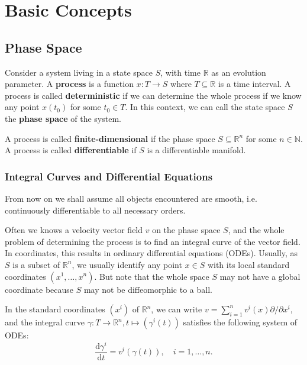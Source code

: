 \documentclass[../main.tex]{subfiles}
\begin{document}
\chapter{Basic Concepts}

\section{Phase Space}
Consider a system living in a state space $S$, with time $\mathbb{R}$ as an evolution parameter. A \textbf{process} is a function $x: T \to S$ where $T \subseteq \mathbb{R}$ is a time interval. A process is called \textbf{deterministic} if we can determine the whole process if we know any point $x(t_0)$ for some $t_0 \in T$. In this context, we can call the state space $S$ the \textbf{phase space} of the system.

A process is called \textbf{finite-dimensional} if the phase space $S \subseteq \mathbb{R}^n$ for some $n \in \mathbb{N}$. A process is called \textbf{differentiable} if $S$ is a differentiable manifold.

\subsection{Integral Curves and Differential Equations}


\begin{plainblackenv}
  From now on we shall assume all objects encountered are smooth, i.e. continuously differentiable to all necessary orders.
\end{plainblackenv}
Often we knows a velocity vector field $v$ on the phase space $S$, and the whole problem of determining the process is to find an integral curve of the vector field. In coordinates, this results in ordinary differential equations (ODEs). Usually, as $S$ is a subset of $\mathbb{R}^n$, we usually identify any point $x \in S$ with its local standard coordinates $(x^1, \dots, x^n)$. But note that the whole space $S$ may not have a global coordinate because $S$ may not be diffeomorphic to a ball.

In the standard coordinates $(x^i)$ of $\mathbb{R}^n$, we can write $v = \sum_{i=1}^n v^i(x) \partial / \partial x^i$, and the integral curve $\gamma: T \to \mathbb{R}^n, t \mapsto (\gamma^i(t))$ satisfies the following system of ODEs:
\begin{equation}
  \frac{\mathrm{d} \gamma^i}{\mathrm{d} t} = v^i(\gamma(t)), \quad i = 1, \dots, n.
\end{equation}
\end{document}
